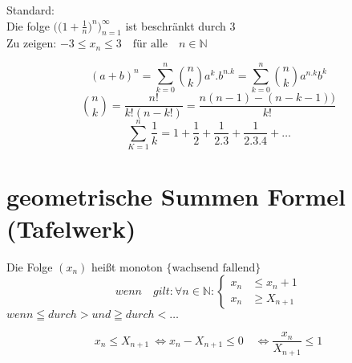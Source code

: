 \begin{example}{Standard:}\\

{Die folge}
$ \bigg(\big(1 + \frac{1}{n} \big)^n \bigg)^\infty_{n=1}$
{ist beschränkt durch 3}\\

Zu zeigen: \quad $ -3 \leq x_n \leq 3 \quad \text{für alle} \quad n \in \mathbb{N} $


\[ { (a+b)^n = \sum_{k=0}^{n} \binom{n}{k} a^k . b^{n .k} = \sum_{k=0}^{n} \binom{n}{k} a^{n.k} b^k }  \]
\[  \binom{n}{k} = \frac{n!}{k!(n-k!)} =  \frac{n(n-1) -(n-k-1))}{k!} \]
\[  \sum_{K=1}^{n} \frac{1}{k} = 1+ \frac{1}{2} + \frac{1}{2.3} + \frac{1}{2.3.4} + \dots \]
\end{example}


\section{geometrische Summen Formel (Tafelwerk)}
\begin{definition}

    Die Folge $(x_n)$ heißt monoton $\Big\{ \text{wachsend fallend} \Big\}$
    \[ wenn \quad gilt: \forall n \in \mathbb{N}:
    \left\{
    \begin{array}{ll}
        x_n  & \leq x_n +1 \\
        x_n  & \geq X_{n+1}
    \end{array}
    \right. \]
    $ wenn \leqq durch > und \geqq durch < \dots  $
\end{definition}
\begin{remark}
    \[ x_n \leq X_{n+1} \ \Leftrightarrow  x_n - X_{n+1} \leq 0 \quad \Leftrightarrow  \frac{x_n}{X_{n+1}} \leq 1 \]
\end{remark}

